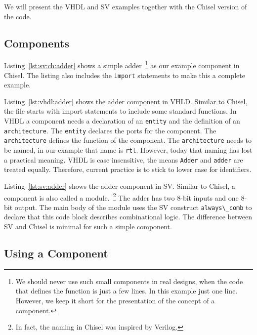 \documentclass[%
    10pt,
    headinclude, footexclude,
    openright, %
    notitlepage,
    cleardoubleempty,
    headsepline,
    pointlessnumbers,
    bibtotoc, idxtotoc,
    ]{scrbook}
\newcommand{\code}[1]{{\lstinline[basicstyle=\small\ttfamily]{#1}}}
\begin{document}
We will present the VHDL and SV examples together with the Chisel version
of the code.

\subsection{Components}



Listing~\ref{lst:sv:ch:adder} shows a simple adder~\footnote{We should never use
such small components in real designs, when the code that defines the function is just a few lines.
In this example just one line. However, we keep it short for the presentation
of the concept of a component.}
as our example component in Chisel.
The listing also includes the \code{import} statements to make this a complete example.

Listing~\ref{lst:vhdl:adder} shows the adder component in VHLD. Similar to Chisel,
the file starts with import statements to include some standard functions.
In VHDL a component needs a declaration of an \code{entity} and the definition
of an \code{architecture}. The \code{entity} declares the ports for the component.
The \code{architecture} defines the function of the component.
The \code{architecture} needs to be named, in our example that name is \code{rtl}.
However, today that naming has lost a practical meaning.
VHDL is case insensitive, the means \code{Adder} and \code{adder} are treated
equally. Therefore, current practice is to stick to lower case for identifiers.


Listing~\ref{lst:sv:adder} shows the adder component in SV. Similar to Chisel,
a component is also called a module.~\footnote{In fact, the naming in Chisel
was inspired by Verilog.}
The adder has two 8-bit inputs and one 8-bit
output. The main body of the module uses the SV construct \code{always\_comb}
to declare that this code block describes combinational logic.
The difference between SV and Chisel is minimal for such a simple component.


\subsection{Using a Component}
\end{document}
